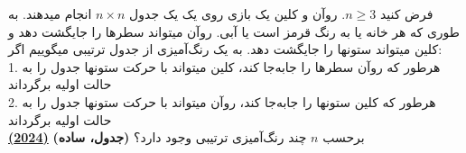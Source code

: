 فرض کنید $n \ge 3$. روآن و کلین یک بازی روی یک یک جدول $n \times n$ انجام میدهند.
به طوری که هر خانه یا به رنگ قرمز است یا آبی.
روآن میتواند سطرها را جایگشت دهد و کلین میتواند ستونها را جایگشت دهد.
به یک رنگ‌آمیزی از جدول ترتیبی میگوییم اگر:\\
1. هرطور که روآن سطرها را جابه‌جا کند، کلین میتواند با حرکت ستونها جدول را به حالت اولیه برگرداند
\\
2. هرطور که کلین ستونها را جابه‌جا کند، روآن میتواند با حرکت ستونها جدول را به حالت اولیه برگرداند\\
برحسب $n$ چند رنگ‌آمیزی ترتیبی وجود دارد؟
\textbf{(جدول، ساده)}
\href{https://artofproblemsolving.com/community/c5h3281781p30227193}{\textbf{(2024)}}